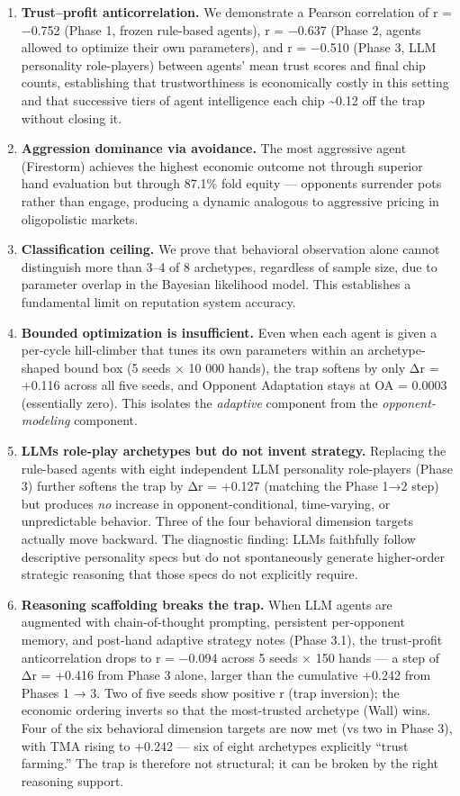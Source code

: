 \documentclass[
]{article}
\begin{document}
\begin{enumerate}
\def\labelenumi{\arabic{enumi}.}
\item
  \textbf{Trust--profit anticorrelation.} We demonstrate a Pearson
  correlation of r = −0.752 (Phase 1, frozen rule-based agents), r =
  −0.637 (Phase 2, agents allowed to optimize their own parameters), and
  r = −0.510 (Phase 3, LLM personality role-players) between agents'
  mean trust scores and final chip counts, establishing that
  trustworthiness is economically costly in this setting and that
  successive tiers of agent intelligence each chip \textasciitilde0.12
  off the trap without closing it.
\item
  \textbf{Aggression dominance via avoidance.} The most aggressive agent
  (Firestorm) achieves the highest economic outcome not through superior
  hand evaluation but through 87.1\% fold equity --- opponents surrender
  pots rather than engage, producing a dynamic analogous to aggressive
  pricing in oligopolistic markets.
\item
  \textbf{Classification ceiling.} We prove that behavioral observation
  alone cannot distinguish more than 3--4 of 8 archetypes, regardless of
  sample size, due to parameter overlap in the Bayesian likelihood
  model. This establishes a fundamental limit on reputation system
  accuracy.
\item
  \textbf{Bounded optimization is insufficient.} Even when each agent is
  given a per-cycle hill-climber that tunes its own parameters within an
  archetype-shaped bound box (5 seeds × 10 000 hands), the trap softens
  by only Δr = +0.116 across all five seeds, and Opponent Adaptation
  stays at OA = 0.0003 (essentially zero). This isolates the
  \emph{adaptive} component from the \emph{opponent-modeling} component.
\item
  \textbf{LLMs role-play archetypes but do not invent strategy.}
  Replacing the rule-based agents with eight independent LLM personality
  role-players (Phase 3) further softens the trap by Δr = +0.127
  (matching the Phase 1→2 step) but produces \emph{no} increase in
  opponent-conditional, time-varying, or unpredictable behavior. Three
  of the four behavioral dimension targets actually move backward. The
  diagnostic finding: LLMs faithfully follow descriptive personality
  specs but do not spontaneously generate higher-order strategic
  reasoning that those specs do not explicitly require.
\item
  \textbf{Reasoning scaffolding breaks the trap.} When LLM agents are
  augmented with chain-of-thought prompting, persistent per-opponent
  memory, and post-hand adaptive strategy notes (Phase 3.1), the
  trust-profit anticorrelation drops to r = −0.094 across 5 seeds × 150
  hands --- a step of Δr = +0.416 from Phase 3 alone, larger than the
  cumulative +0.242 from Phases 1 → 3. Two of five seeds show positive r
  (trap inversion); the economic ordering inverts so that the
  most-trusted archetype (Wall) wins. Four of the six behavioral
  dimension targets are now met (vs two in Phase 3), with TMA rising to
  +0.242 --- six of eight archetypes explicitly ``trust farming.'' The
  trap is therefore not structural; it can be broken by the right
  reasoning support.
\end{enumerate}
\end{document}

